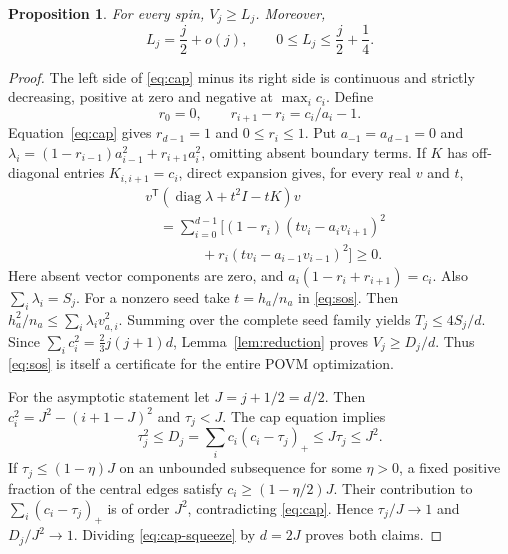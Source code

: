 \documentclass[aps,pra,reprint,superscriptaddress,longbibliography]{revtex4-2}
\newtheorem{proposition}[theorem]{Proposition}
\theoremstyle{remark}
\DeclareMathOperator{\diag}{diag}
\begin{document}
\begin{proposition}\label{prop:lower}
For every spin, $V_j\geq L_j$. Moreover,
\begin{equation}
 L_j=\frac j2+o(j),\qquad 0\leq L_j\leq\frac j2+\frac14.
 \label{eq:lower-asymptotic}
\end{equation}
\end{proposition}
\begin{proof}
The left side of \eqref{eq:cap} minus its right side is continuous
and strictly decreasing, positive at zero and negative at
$\max_i c_i$. Define
\[
 r_0=0,\qquad r_{i+1}-r_i=c_i/a_i-1.
\]
Equation~\eqref{eq:cap} gives $r_{d-1}=1$ and $0\leq r_i\leq1$.
Put $a_{-1}=a_{d-1}=0$ and
$\lambda_i=(1-r_{i-1})a_{i-1}^2+r_{i+1}a_i^2$, omitting absent
boundary terms. If $K$ has off-diagonal entries $K_{i,i+1}=c_i$,
direct expansion gives, for every real $v$ and $t$,
\begin{equation}
\begin{aligned}
&v^{\mathsf T}(\diag\lambda+t^2I-tK)v\\
&\quad=\sum_{i=0}^{d-1}\bigl[(1-r_i)(tv_i-a_iv_{i+1})^2\\
&\qquad\qquad{}+r_i(tv_i-a_{i-1}v_{i-1})^2\bigr]\geq0.
\end{aligned}
\label{eq:sos}
\end{equation}
Here absent vector components are zero, and
$a_i(1-r_i+r_{i+1})=c_i$. Also $\sum_i\lambda_i=S_j$.
For a nonzero seed take $t=h_a/n_a$ in \eqref{eq:sos}. Then
$h_a^2/n_a\leq\sum_i\lambda_i v_{a,i}^2$.
Summing over the complete seed family yields $T_j\leq4S_j/d$.
Since $\sum_i c_i^2=\frac23j(j+1)d$,
Lemma~\ref{lem:reduction} proves $V_j\geq D_j/d$.
Thus \eqref{eq:sos} is itself a certificate for the entire POVM
optimization.

For the asymptotic statement let $J=j+1/2=d/2$. Then
$c_i^2=J^2-(i+1-J)^2$ and $\tau_j<J$. The cap equation implies
\begin{equation}
 \tau_j^2\leq D_j=\sum_i c_i(c_i-\tau_j)_+
 \leq J\tau_j\leq J^2.
 \label{eq:cap-squeeze}
\end{equation}
If $\tau_j\leq(1-\eta)J$ on an unbounded subsequence for some
$\eta>0$, a fixed positive fraction of the central edges satisfy
$c_i\geq(1-\eta/2)J$. Their contribution to
$\sum_i(c_i-\tau_j)_+$ is of order $J^2$, contradicting
\eqref{eq:cap}. Hence $\tau_j/J\to1$ and $D_j/J^2\to1$.
Dividing \eqref{eq:cap-squeeze} by $d=2J$ proves both claims.
\end{proof}
\end{document}
